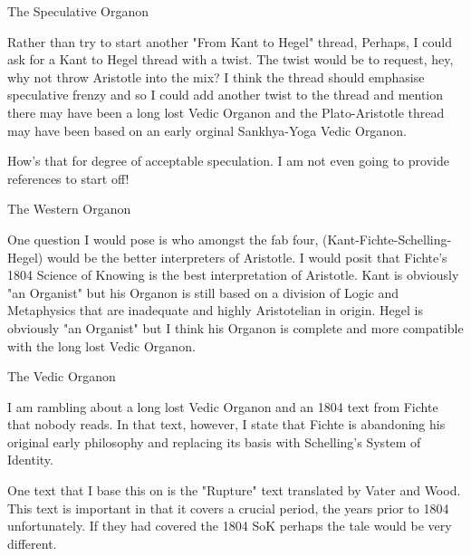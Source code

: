 The Speculative Organon

Rather than try to start another "From Kant to Hegel" thread,
Perhaps, I could ask for a Kant to Hegel thread with a twist.
The twist would be to request, hey,
why not throw Aristotle into the mix?
I think the thread should emphasise speculative frenzy
and so I could add another twist to the thread and mention
there may have been a long lost Vedic Organon and the
Plato-Aristotle thread may have been based on an early
orginal Sankhya-Yoga Vedic Organon.

How's that for degree of acceptable speculation.
I am not even going to provide references to start off!

The Western Organon

One question I would pose is who amongst the fab four,
(Kant-Fichte-Schelling-Hegel) would be the better interpreters
of Aristotle. I would posit that Fichte's 1804 Science of Knowing
is the best interpretation of Aristotle.
Kant is obviously "an Organist" but his Organon is still
based on a division of Logic and Metaphysics that are inadequate
and highly Aristotelian in origin.
Hegel is obviously "an Organist" but I think his Organon is complete
and more compatible with the long lost Vedic Organon.

The Vedic Organon

I am rambling about a long lost Vedic Organon
and an 1804 text from Fichte that nobody reads.
In that text, however, I state that Fichte is abandoning
his original early philosophy and replacing its basis with
Schelling's System of Identity.

One text that I base this on is the "Rupture" text translated
by Vater and Wood. This text is important in that it covers
a crucial period, the years prior to 1804 unfortunately.
If they had covered the 1804 SoK perhaps the tale would be
very different.
